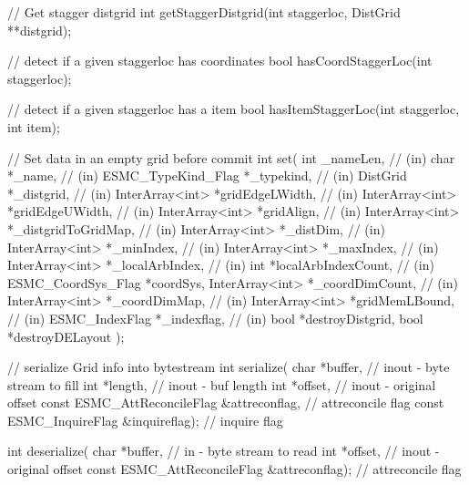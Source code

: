 {{ 
   // Get stagger distgrid
   int getStaggerDistgrid(int staggerloc, DistGrid **distgrid);
 
 
   // detect if a given staggerloc has coordinates
   bool hasCoordStaggerLoc(int staggerloc);
 
   // detect if a given staggerloc has a item
   bool hasItemStaggerLoc(int staggerloc, int item);
 
   // Set data in an empty grid before commit
   int set(
       int _nameLen,                                // (in)
       char *_name,                                 // (in)
       ESMC_TypeKind_Flag *_typekind,                    // (in)
       DistGrid *_distgrid,                    // (in)
       InterArray<int> *gridEdgeLWidth,          // (in)
       InterArray<int> *gridEdgeUWidth,          // (in)
       InterArray<int> *gridAlign,          // (in)
       InterArray<int> *_distgridToGridMap,                  // (in)
       InterArray<int> *_distDim,                  // (in)
           InterArray<int> *_minIndex,          // (in)
           InterArray<int> *_maxIndex,          // (in)
           InterArray<int> *_localArbIndex,          // (in)
           int *localArbIndexCount,          // (in)
           ESMC_CoordSys_Flag *coordSys,
       InterArray<int> *_coordDimCount,              // (in)
       InterArray<int> *_coordDimMap,             // (in)
       InterArray<int> *gridMemLBound,          // (in)
       ESMC_IndexFlag *_indexflag,                  // (in)
       bool *destroyDistgrid,
       bool *destroyDELayout
       );
 
   // serialize Grid info into bytestream
   int serialize(
                 char *buffer,   // inout - byte stream to fill
                 int *length,    // inout - buf length
                 int *offset,    // inout - original offset
                 const ESMC_AttReconcileFlag &attreconflag,  // attreconcile flag
                 const ESMC_InquireFlag &inquireflag);       // inquire flag
 
   int deserialize(
                   char *buffer,          // in - byte stream to read
                   int *offset,           // inout - original offset
                   const ESMC_AttReconcileFlag &attreconflag);  // attreconcile flag 
 
}}
